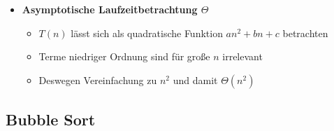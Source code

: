 \documentclass[
    ngerman,
    color=3b,
    load_common, %
    summary,
    boxarc,
]{tuda_summary}
\begin{document}
\begin{itemize}
    \item \textbf{Asymptotische Laufzeitbetrachtung $\Theta$} {\label{insSortLaufzeitTheta}}
          \begin{itemize}
              \item $T(n)$ lässt sich als quadratische Funktion $an^2 + bn + c$ betrachten
              \item Terme niedriger Ordnung sind für gro\ss e $n$ irrelevant
              \item Deswegen Vereinfachung zu $n^2$ und damit $\Theta(n^2)$
          \end{itemize}
\end{itemize}
\clearpage
\subsection{Bubble Sort}\label{BubbleSort}
\end{document}
